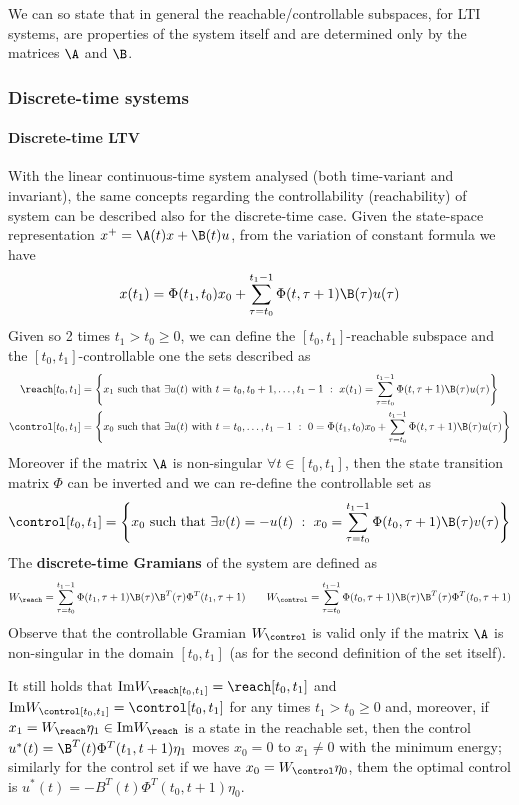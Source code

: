 		We can so state that in general the reachable/controllable subspaces, for LTI systems, are properties of the system itself and are determined only by the matrices $\A$ and $\B$.
		
	\subsubsection{Discrete-time systems}
		\paragraph{Discrete-time LTV} With the linear continuous-time system analysed (both time-variant and invariant), the same concepts regarding the controllability (reachability) of system can be described also for the discrete-time case. Given the state-space representation $x^+ = \A(t) x + \B(t) u$, from the variation of constant formula we have 
		\[ x(t_1) = \Phi(t_1,t_0) x_0 + \sum_{\tau=t_0}^{t_1-1} \Phi(t,\tau+1) \B(\tau) u(\tau) \]
		Given so 2 times $t_1 > t_0 \geq 0$, we can define the $[t_0,t_1]$-reachable subspace and the $[t_0,t_1]$-controllable one the sets described as
		\begin{align*}
			\reach[t_0,t_1] & = \left\{ x_1 \textrm{ such that } \exists u(t) \textrm{ with } t = t_0,t_0+1,\dots, t_1-1 \ : \ x(t_1) = \sum_{\tau=t_0}^{t_1-1} \Phi(t,\tau+1) \B(\tau) u(\tau) \right\} \\
			\control[t_0,t_1] & = \left\{ x_0 \textrm{ such that } \exists u(t) \textrm{ with } t = t_0,\dots, t_1-1 \ : \ 0 = \Phi(t_1,t_0) x_0 + \sum_{\tau=t_0}^{t_1-1} \Phi(t,\tau+1) \B(\tau) u(\tau) \right\}
		\end{align*}
		Moreover if the matrix $\A$ is non-singular $\forall t \in [t_0,t_1]$, then the state transition matrix $\Phi$ can be inverted and we can re-define the controllable set as
		\[ \control[t_0,t_1] = \left\{ x_0 \textrm{ such that } \exists v(t) = -u(t) \ : \ x_0 = \sum_{\tau = t_0}^{t_1-1} \Phi(t_0,\tau+1) \B(\tau) v(\tau) \right\}  \]
		The \textbf{discrete-time Gramians} of the system are defined as
		\[ W_\reach = \sum_{\tau = t_0}^{t_1 - 1} \Phi(t_1,\tau+1) \B(\tau) \B^T(\tau) \Phi^T(t_1,\tau+1) \qquad W_\control = \sum_{\tau = t_0}^{t_1 - 1} \Phi(t_0,\tau+1) \B(\tau) \B^T(\tau) \Phi^T(t_0,\tau+1) \]
		Observe that the controllable Gramian $W_\control$ is valid only if the matrix $\A$ is non-singular in the domain $[t_0,t_1]$ (as for the second definition of the set itself).
		
		It still holds that $\textrm{Im} W_\reach[t_0,t_1] = \reach[t_0,t_1]$ and $\textrm{Im} W_\control[t_0,t_1] = \control[t_0,t_1]$ for any times $t_1 > t_0 \geq 0$ and, moreover, if $x_1 = W_\reach \eta_1 \in \textrm{Im} W_\reach$ is a state in the reachable set, then the control $u^*(t) = \B^T(t) \Phi^T(t_1,t+1) \eta_1$ moves $x_0 = 0$ to $x_1\neq 0$ with the minimum energy; similarly for the control set if we have $x_0 = W_\control \eta_0$, them the optimal control is $u^*(t) = - B^T(t)\Phi^T(t_0,t+1)\eta_0$.
		

